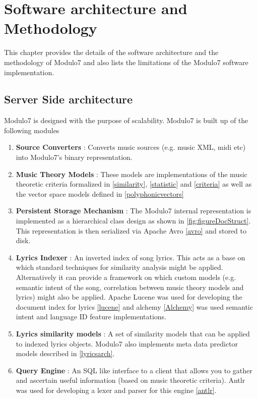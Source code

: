 \chapter{Software architecture and Methodology}
\noindent This chapter provides the details of the software architecture and the methodology of Modulo7 and also lists the limitations of the Modulo7 software implementation. 
\section{Server Side architecture}
\noindent Modulo7 is designed with the purpose of scalability. Modulo7 is built up of the following modules
\begin{enumerate}
\item \textbf{Source Converters} : Converts music sources (e.g. music XML, midi etc) into Modulo7's binary representation.
\item \textbf{Music Theory Models} : These models are implementations of the music  theoretic criteria formalized in \ref{similarity}, \ref{statistic} and \ref{criteria} as well as the vector space models defined in \ref{polyphonicvectors}
\item \textbf{Persistent Storage Mechanism} : The Modulo7 internal representation is implemented as a hierarchical class design as shown in \ref{fig:figureDocStruct}. This representation is then serialized via Apache Avro \ref{avro} and stored to disk. 
\item \textbf{Lyrics Indexer} : An inverted index of song lyrics. This acts as a base on which standard techniques for similarity analysis might be applied. Alternatively it can provide a framework on which custom models (e.g. semantic intent of the song, correlation between music theory models and lyrics) might also be applied. Apache Lucene was used for developing the document index for lyrics \ref{lucene} and alchemy \ref{Alchemy} was used semantic intent and language ID feature implementations.  
\item \textbf{Lyrics similarity models} : A set of similarity models that can be applied to indexed lyrics objects. Modulo7 also implements meta data predictor models described in \ref{lyricsarch}. 
\item \textbf{Query Engine} : An SQL like interface to a client that allows you to gather and ascertain useful information (based on music theoretic criteria). Antlr was used for developing a lexer and parser for this engine \ref{antlr}. 
\end{enumerate}

